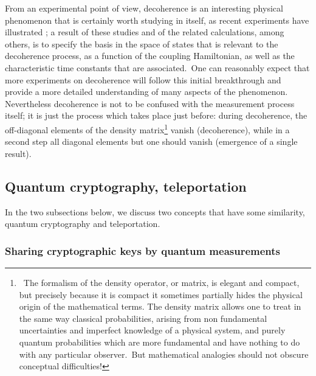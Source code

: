 \documentclass[12pt,onecolumn]{article}%
\begin{document}
From an experimental point of view, decoherence is an interesting physical
phenomenon that is certainly worth studying in itself, as recent experiments
have illustrated \cite{Brune}; a result of these studies and of the related
calculations, among others, is to specify the basis in the space of states
that is relevant to the decoherence process, as a function of the coupling
Hamiltonian, as well as the characteristic time constants that are
associated.\ One can reasonably expect that more experiments on decoherence
will follow this initial breakthrough and provide a more detailed
understanding of many aspects of the phenomenon. Nevertheless decoherence is
not to be confused with the measurement process itself; it is just the process
which takes place just before: during decoherence, the off-diagonal elements
of the density matrix\footnote{\ The formalism of the density operator, or
matrix, is elegant and compact, but precisely because it is compact it
sometimes partially hides the physical origin of the mathematical terms. The
density matrix allows one to treat in the same way classical probabilities,
arising from non fundamental uncertainties and imperfect knowledge of a
physical system, and purely quantum probabilities which are more fundamental
and have nothing to do with any particular observer.\ But mathematical
analogies should not obscure conceptual difficulties!} vanish (decoherence),
while in a second step all diagonal elements but one should vanish (emergence
of a single result).

\subsection{Quantum cryptography, teleportation}

\label{crypto}

In the two subsections below, we discuss two concepts that have some
similarity, quantum cryptography and teleportation.

\subsubsection{Sharing cryptographic keys by quantum measurements}
\end{document}
